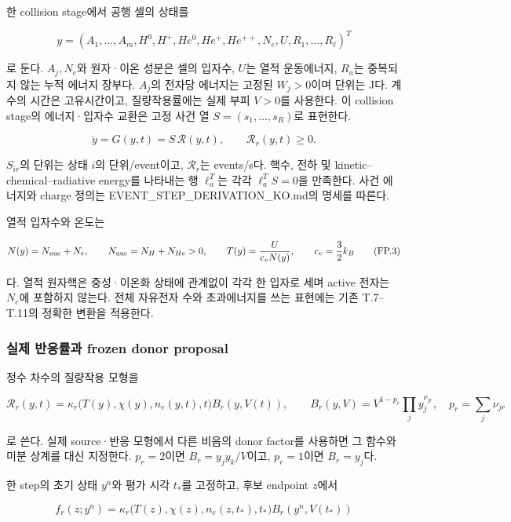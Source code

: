\documentclass[11pt,a4paper]{article}
\begin{document}
한 collision stage에서 공행 셀의 상태를

\[
y=(A_1,\ldots,A_m,H^0,H^+,He^0,He^+,He^{++},N_e,U,R_1,\ldots,R_\ell)^T
\tag{FP.1}
\]

로 둔다. \(A_j,N_e\)와 원자·이온 성분은 셀의 입자수, \(U\)는 열적 운동에너지, \(R_a\)는 중복되지 않는 누적 에너지 장부다. \(A_j\)의 전자당 에너지는 고정된 \(W_j>0\)이며 단위는 J다. 계수의 시간은 고유시간이고, 질량작용률에는 실제 부피 \(V>0\)를 사용한다. 이 collision stage의 에너지·입자수 교환은 고정 사건 열 \(S=(s_1,\ldots,s_R)\)로 표현한다.

\[
\dot y=G(y,t)=S\,\mathcal R(y,t),\qquad
\mathcal R_r(y,t)\ge0.
\tag{FP.2}
\]

\(S_{ir}\)의 단위는 상태 \(i\)의 단위/event이고, \(\mathcal R_r\)는 events/s다. 핵수, 전하 및 kinetic--chemical--radiative energy를 나타내는 행 \(\ell_a^T\)는 각각 \(\ell_a^TS=0\)을 만족한다. 사건 에너지와 charge 정의는 EVENT\_STEP\_DERIVATION\_KO.md의 명세를 따른다.

열적 입자수와 온도는

\[
N(y)=N_{\rm nuc}+N_e,\qquad
N_{\rm nuc}=N_H+N_{He}>0,\qquad
T(y)=\frac{U}{c_vN(y)},\qquad c_v=\frac32k_B
\tag{FP.3}
\]

다. 열적 원자핵은 중성·이온화 상태에 관계없이 각각 한 입자로 세며 active 전자는 \(N_e\)에 포함하지 않는다. 전체 자유전자 수와 초과에너지를 쓰는 표현에는 기존 T.7--T.11의 정확한 변환을 적용한다.

\hypertarget{uxc2e4uxc81c-uxbc18uxc751uxb960uxacfc-frozen-donor-proposal}{%
\subsubsection{실제 반응률과 frozen donor proposal}\label{uxc2e4uxc81c-uxbc18uxc751uxb960uxacfc-frozen-donor-proposal}}

정수 차수의 질량작용 모형을

\[
\mathcal R_r(y,t)=
\kappa_r\bigl(T(y),\chi(y),n_e(y,t),t\bigr)
B_r(y,V(t)),
\qquad
B_r(y,V)=V^{1-p_r}\prod_j y_j^{\nu_{jr}},
\quad p_r=\sum_j\nu_{jr}
\tag{FP.4}
\]

로 쓴다. 실제 source·반응 모형에서 다른 비음의 donor factor를 사용하면 그 함수와 미분 상계를 대신 지정한다. \(p_r=2\)이면 \(B_r=y_jy_k/V\)이고, \(p_r=1\)이면 \(B_r=y_j\)다.

한 step의 초기 상태 \(y^n\)와 평가 시각 \(t_*\)를 고정하고, 후보 endpoint \(z\)에서

\[
f_r(z;y^n)=
\kappa_r\bigl(T(z),\chi(z),n_e(z,t_*),t_*\bigr)
B_r(y^n,V(t_*))
\tag{FP.5}
\]
\end{document}
